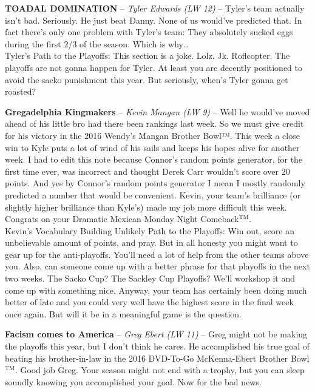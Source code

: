 \documentclass[11pt,letterpaper]{article}
\begin{document}
\begin{etaremune}
\setcounter{enumi}{13}
\item \textbf{TOADAL DOMINATION} -- \textit{Tyler Edwards (LW 12)} -- Tyler's team actually isn't bad. Seriously. He just beat Danny. None of us would've predicted that. In fact there's only one problem with Tyler's team: They absolutely sucked eggs during the first 2/3 of the season. Which is why…
\medskip\\Tyler's Path to the Playoffs: This section is a joke. Lolz. Jk. Roflcopter. The playoffs are not gonna happen for Tyler. At least you are decently positioned to avoid the sacko punishment this year. But seriously, when's Tyler gonna get roasted?
\item \textbf{Gregadelphia Kingmakers} -- \textit{Kevin Mangan (LW 9)} -- Well he would've moved ahead of his little bro had there been rankings last week. So we must give credit for his victory in the 2016 Wendy's Mangan Brother Bowl™. This week a close win to Kyle puts a lot of wind of his sails and keeps his hopes alive for another week. I had to edit this note because Connor's random points generator, for the first time ever, was incorrect and thought Derek Carr wouldn't score over 20 points. And yes by Connor's random points generator I mean I mostly randomly predicted a number that would be convenient. Kevin, your team's brilliance (or slightly higher brilliance than Kyle's) made my job more difficult this week. Congrats on your Dramatic Mexican Monday Night Comeback$^\text{TM}$.
\medskip\\ Kevin's Vocabulary Building Unlikely Path to the Playoffs: Win out, score an unbelievable amount of points, and pray. But in all honesty you might want to gear up for the anti-playoffs. You'll need a lot of help from the other teams above you. Also, can someone come up with a better phrase for that playoffs in the next two weeks. The Sacko Cup? The Sackley Cup Playoffs? We'll workshop it and come up with something nice. Anyway, your team has certainly been doing much better of late and you could very well have the highest score in the final week once again. But will it be in a meaningful game is the question. 
\item \textbf{Facism comes to America} -- \textit{Greg Ebert (LW 11)} -- Greg might not be making the playoffs this year, but I don't think he cares. He accomplished his true goal of beating his brother-in-law in the 2016 DVD-To-Go McKenna-Ebert Brother Bowl$^\text{TM}$. Good job Greg. Your season might not end with a trophy, but you can sleep soundly knowing you accomplished your goal. Now for the bad news.

\end{etaremune}
\end{document}
